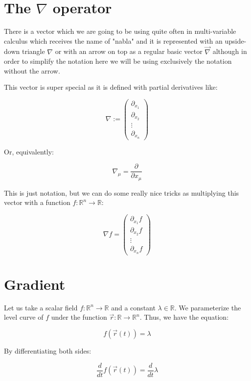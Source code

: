\documentclass[12pt]{article}
\begin{document}
	\section{The $\nabla$ operator}
	
	There is a vector which we are going to be using quite often in multi-variable calculus which receives the name of "nabla" and it is represented with an upside-down triangle $\nabla$ or with an arrow on top as a regular basic vector $\vec{\nabla}$ although in order to simplify the notation here we will be using exclusively the notation without the arrow.
	
	This vector is super special as it is defined with partial derivatives like:
	
	\[
		\nabla :=
		\begin{pmatrix}
			\partial_{x_1}
			\\
			\partial_{x_2}
			\\
			\vdots
			\\
			\partial_{x_n}
		\end{pmatrix}
	\]
	
	Or, equivalently:
	
	\[
		\nabla_\mu = \frac{\partial}{\partial x_\mu}
	\]
	
	This is just notation, but we can do some really nice tricks as multiplying this vector with a function $f : \mathbb{R}^n \to \mathbb{R}$:
	
	\[
		\nabla f =
		\begin{pmatrix}
			\partial_{x_1} f
			\\
			\partial_{x_2} f
			\\
			\vdots
			\\
			\partial_{x_n} f
		\end{pmatrix}
	\]
	
	\section{Gradient}
	
	Let us take a scalar field $f : \mathbb{R}^n \to \mathbb{R}$ and a constant $\lambda \in \mathbb{R}$. We parameterize the level curve of $f$ under the function $\vec{r} : \mathbb{R} \to \mathbb{R}^n$. Thus, we have the equation:
	
	\[
		f(\vec{r}(t)) = \lambda
	\]
	
	By differentiating both sides:
	
	\[
		\frac{d}{dt} f(\vec{r}(t)) = \frac{d}{dt} \lambda
	\]
	
\end{document}
